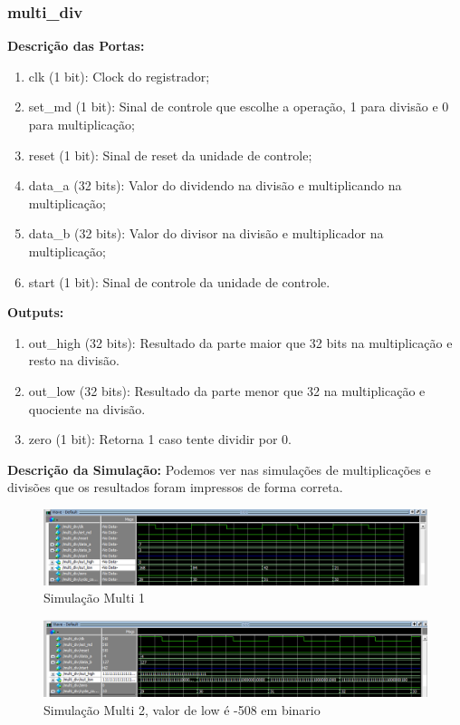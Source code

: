 \subsubsection{multi\_div}
\textbf{Descrição das Portas:}

\begin{enumerate}
    \item clk (1 bit): Clock do registrador;
    \item set\_md (1 bit): Sinal de controle que escolhe a operação, 1 para divisão e 0 para multiplicação;
    \item reset (1 bit): Sinal de reset da unidade de controle;
    \item data\_a (32 bits): Valor do dividendo na divisão e multiplicando na multiplicação;
    \item data\_b (32 bits): Valor do divisor na divisão e multiplicador na multiplicação;
    \item start (1 bit): Sinal de controle da unidade de controle.
\end{enumerate}

\textbf{Outputs:}

\begin{enumerate}
    \item out\_high (32 bits): Resultado da parte maior que 32 bits na multiplicação e resto na divisão.
    \item out\_low (32 bits): Resultado da parte menor que 32 na multiplicação e quociente na divisão.
    \item zero (1 bit): Retorna 1 caso tente dividir por 0.
\end{enumerate}

\textbf{Descrição da Simulação:} Podemos ver nas simulações de multiplicações e divisões que os resultados foram impressos de forma correta.

\begin{figure}[htbp!]
\centering
\includegraphics[width=1\textwidth]{figure/simulacao_mult_1.png}
\caption{Simulação Multi 1} 
\label{fig:imagem_massa}
\end{figure}

\begin{figure}[htbp!]
\centering
\includegraphics[width=1\textwidth]{figure/simulacao_mult_2.png}
\caption{Simulação Multi 2, valor de low é -508 em binario} 
\label{fig:imagem_massa}
\end{figure}

